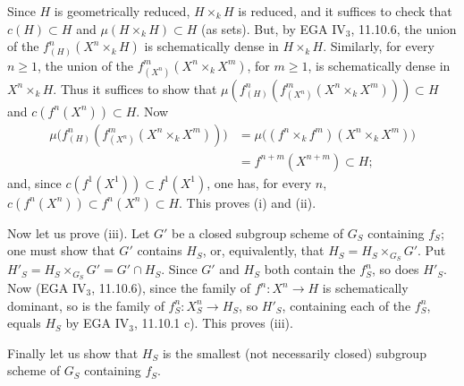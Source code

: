 Since $H$ is geometrically reduced, $H\times_kH$ is reduced, and it suffices to check that $c(H)\subset H$ and $\mu(H\times_kH)\subset H$ (as sets). But, by EGA IV$_3$, 11.10.6, the union of the $f^n_{(H)}(X^n\times_kH)$ is schematically dense in $H\times_kH$. Similarly, for every $n\ge1$, the union of the $f^m_{(X^n)}(X^n\times_kX^m)$, for $m\ge1$, is schematically dense in $X^n\times_kH$. Thus it suffices to show that $\mu(f^n_{(H)}(f^m_{(X^n)}(X^n\times_kX^m)))\subset H$ and $c(f^n(X^n))\subset H$. Now
\[
\begin{aligned}
\mu\bigl(f^n_{(H)}(f^m_{(X^n)}(X^n\times_kX^m))\bigr)
&=\mu\bigl((f^n\times_kf^m)(X^n\times_kX^m)\bigr)\\
&=f^{n+m}(X^{n+m})\subset H;
\end{aligned}
\]
and, since $c(f^1(X^1))\subset f^1(X^1)$, one has, for every $n$, $c(f^n(X^n))\subset f^n(X^n)\subset H$. This proves (i) and (ii).

Now let us prove (iii). Let $G'$ be a closed subgroup scheme of $G_S$ containing $f_S$; one must show that $G'$ contains $H_S$, or, equivalently, that $H_S=H_S\times_{G_S}G'$. Put $H'_S=H_S\times_{G_S}G'=G'\cap H_S$. Since $G'$ and $H_S$ both contain the $f_S^n$, so does $H'_S$. Now (EGA IV$_3$, 11.10.6), since the family of $f^n:X^n\to H$ is schematically dominant, so is the family of $f_S^n:X_S^n\to H_S$, so $H'_S$, containing each of the $f_S^n$, equals $H_S$ by EGA IV$_3$, 11.10.1 c). This proves (iii).

Finally let us show that $H_S$ is the smallest (not necessarily closed) subgroup scheme of $G_S$ containing $f_S$.


